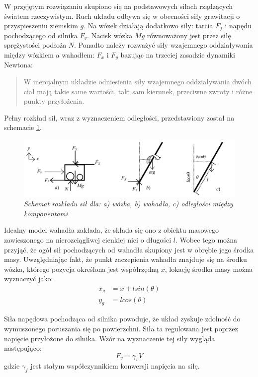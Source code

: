 \documentclass[12pt, oneside]{report}
\theoremstyle{definition}
\begin{document}
W przyjętym rozwiązaniu skupiono się na podstawowych siłach rządzących światem rzeczywistym. Ruch układu odbywa się w obecności siły grawitacji o przyspieszeniu ziemskim $g$. Na wózek działają dodatkowo siły: tarcia $F_f$ i napędu pochodzącego od silnika $F_v$. Nacisk wózka $Mg$ równoważony jest przez siłę sprężystości podłoża $N$. Ponadto należy rozważyć siły wzajemnego oddziaływania między wózkiem a wahadłem: $F_x$ i $F_y$ bazując na trzeciej zasadzie dynamiki Newtona:
\begin{quote}
W inercjalnym układzie odniesienia siły wzajemnego oddziaływania dwóch ciał mają takie same wartości, taki sam kierunek, przeciwne zwroty i różne punkty przyłożenia.
\end{quote}

Pełny rozkład sił, wraz z wyznaczeniem odległości, przedstawiony został na schemacie \ref{SystemForces}.

\begin{figure}[H]
	\centering
		\includegraphics[width = 400pt]{SystemForces} 
		\caption{\textit{Schemat rozkładu sił dla: a) wózka, b) wahadła, c) odległości między komponentami \cite{LMIP}}}
		\label{SystemForces}
\end{figure}

Idealny model wahadła zakłada, że składa się ono z obiektu masowego zawieszonego na nierozciągliwej cienkiej nici o długości $l$. Wobec tego można przyjąć, że ogół sił pochodzących od wahadła skupiony jest w obrębie jego środka masy. Uwzględniając fakt, że punkt zaczepienia wahadła znajduje się na środku wózka, którego pozycja określona jest współrzędną $x$, lokację środka masy można wyznaczyć jako:
\begin{equation} \label{MassCenter}
\begin{aligned}
x_g &= x + lsin(\theta)\\
y_g &= lcos(\theta)
\end{aligned}
\end{equation}

Siła napędowa pochodząca od silnika powoduje, że układ zyskuje zdolność do wymuszonego poruszania się po powierzchni. Siła ta regulowana jest poprzez napięcie przyłożone do silnika. Wzór na wyznaczenie tej siły wygląda następująco:
\begin{equation} \label{Voltage}
F_v = \gamma_v V
\end{equation}
gdzie $\gamma_f$ jest stałym współczynnikiem konwersji napięcia na siłę.
\end{document}
